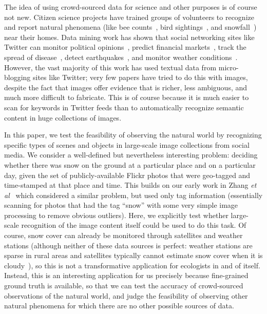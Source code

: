 \documentclass[10pt,journal,compsoc]{IEEEtran}
\begin{document}
The idea of using crowd-sourced data for science and other purposes is
of course not new. Citizen science projects have trained  groups
of volunteers to recognize and report natural phenomena (like bee
counts~\cite{greatsunflower}, bird sightings~\cite{ebirds}, and
snowfall~\cite{king09snowtweets}) near their homes.
Data mining work  has
shown that  social networking sites
like Twitter can 
monitor political opinions~\cite{jin10prediction,digrazia13},
predict financial markets~\cite{bollen11twitter}, track the spread of
disease~\cite{ginsberg09flu}, detect earthquakes~\cite{Sakaki:2010uv}, and monitor weather
conditions~\cite{meteo}. However, the vast majority of this work has
used textual data from micro-blogging sites like Twitter; very few papers have tried to do this with images, despite
the fact that images offer evidence that is richer, less ambiguous,
and much more difficult to fabricate. This is of course because it is
much easier to scan for keywords in Twitter feeds than to
automatically recognize semantic content in huge collections of
images. 



In this paper, we test the feasibility of observing the natural world
by recognizing specific types of scenes and objects in large-scale
image collections from social media.  We consider a well-defined but
nevertheless interesting problem: deciding whether there was snow on
the ground at a particular place and on a particular day, given the
set of publicly-available Flickr photos that were geo-tagged and
time-stamped at that place and time. This builds on our early work in
Zhang \textit{et al}~\cite{ecology2012www} which considered a similar
problem, but used only tag information (essentially scanning for
photos that had the tag ``snow'' with some very simple image
processing to remove obvious outliers). Here, we explicitly test
whether large-scale recognition of the image content itself could be
used to do this task.  Of course, snow cover can already be monitored
through satellites and weather stations (although neither of these
data sources is perfect: weather stations are sparse in rural areas
and satellites typically cannot estimate snow cover when it is
cloudy~\cite{modissnow}), so this is not a transformative application
for ecologists in and of itself. Instead, this is an interesting
application for us precisely because fine-grained ground truth is
available, so that we can test the accuracy of crowd-sourced
observations of the natural world, and judge the feasibility of
observing other natural phenomena for which  there are no other possible sources of data.
\end{document}

